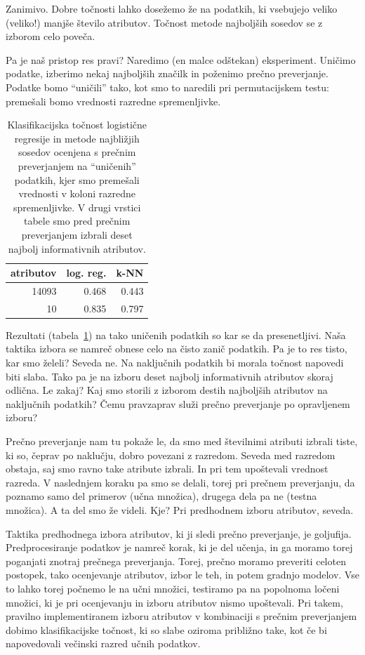 Zanimivo. Dobre točnosti lahko dosežemo že na podatkih, ki vsebujejo veliko (veliko!) manjše število atributov. Točnost metode najboljših sosedov se z izborom celo poveča.

Pa je naš pristop res pravi? Naredimo (en malce odštekan) eksperiment. Uničimo podatke, izberimo nekaj najboljših značilk in poženimo prečno preverjanje. Podatke bomo ``uničili'' tako, kot smo to naredili pri permutacijskem testu: premešali bomo vrednosti razredne spremenljivke.

\begin{table}[htbp]
  \begin{center}
    \begin{tabular}{rrr}
      \toprule
      atributov & log. reg. & k-NN \\
      \midrule
      14093 & 0.468 & 0.443 \\
      10 & 0.835 & 0.797 \\
      \bottomrule
    \end{tabular}
  \end{center}
  \caption{Klasifikacijska točnost logistične regresije in metode najbližjih sosedov ocenjena s prečnim preverjanjem na ``uničenih'' podatkih, kjer smo premešali vrednosti v koloni razredne spremenljivke. V drugi vrstici tabele smo pred prečnim preverjanjem izbrali deset najbolj informativnih atributov.}
  \label{t:fss-cv-false-permutation}
\end{table}

Rezultati (tabela~\ref{t:fss-cv-false-permutation}) na tako uničenih podatkih so kar se da presenetljivi. Naša taktika izbora se namreč obnese celo na čisto zanič podatkih. Pa je to res tisto, kar smo želeli? Seveda ne. Na naključnih podatkih bi morala točnost napovedi biti slaba. Tako pa je na izboru deset najbolj informativnih atributov skoraj odlična. Le zakaj? Kaj smo storili z izborom destih najboljših atributov na naključnih podatkih? Čemu pravzaprav služi prečno preverjanje po opravljenem izboru?

Prečno preverjanje nam tu pokaže le, da smo med številnimi atributi izbrali tiste, ki so, čeprav po naklučju, dobro povezani z razredom. Seveda med razredom obstaja, saj smo ravno take atribute izbrali. In pri tem upoštevali vrednost razreda. V naslednjem koraku pa smo se delali, torej pri prečnem preverjanju, da poznamo samo del primerov (učna množica), drugega dela pa ne (testna množica). A ta del smo že videli. Kje? Pri predhodnem izboru atributov, seveda.

Taktika predhodnega izbora atributov, ki ji sledi prečno preverjanje, je goljufija. Predprocesiranje podatkov je namreč korak, ki je del učenja, in ga moramo torej poganjati znotraj prečnega preverjanja. Torej, prečno moramo preveriti celoten postopek, tako ocenjevanje atributov, izbor le teh, in potem gradnjo modelov. Vse to lahko torej počnemo le na učni množici, testiramo pa na popolnoma ločeni množici, ki je pri ocenjevanju in izboru atributov nismo upoštevali. Pri takem, pravilno implementiranem izboru atributov v kombinaciji s prečnim preverjanjem dobimo klasifikacijske točnost, ki so slabe oziroma približno take, kot če bi napovedovali večinski razred učnih podatkov.

